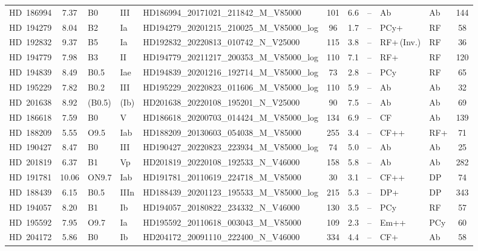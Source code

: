 {\begin{landscape}
\begin{longtable}{lclllcclllc}
\noalign{\smallskip}
HD~186994 & 7.37 & B0 & III & HD186994\_20171021\_211842\_M\_V85000 & 101 & 6.6 & -- & Ab & Ab & 144 \\
\noalign{\smallskip}
HD~194279 & 8.04 & B2 & Ia & HD194279\_20201215\_210025\_M\_V85000\_log & 96 & 1.7 & -- & PCy+ & RF & 58 \\
\noalign{\smallskip}
HD~192832 & 9.37 & B5 & Ia & HD192832\_20220813\_010742\_N\_V25000 & 115 & 3.8 & -- & RF+\,(Inv.) & RF & 36 \\
\noalign{\smallskip}
HD~194779 & 7.98 & B3 & II & HD194779\_20211217\_200353\_M\_V85000\_log & 110 & 7.1 & -- & RF+ & RF & 120 \\
\noalign{\smallskip}
HD~194839 & 8.49 & B0.5 & Iae & HD194839\_20201216\_192714\_M\_V85000\_log & 73 & 2.8 & -- & PCy & RF & 65 \\
\noalign{\smallskip}
HD~195229 & 7.82 & B0.2 & III & HD195229\_20220823\_011606\_M\_V85000\_log & 110 & 5.9 & -- & Ab & Ab & 32 \\
\noalign{\smallskip}
HD~201638 & 8.92 & (B0.5) & (Ib) & HD201638\_20220108\_195201\_N\_V25000 & 90 & 7.5 & -- & Ab & Ab & 69 \\
\noalign{\smallskip}
HD~186618 & 7.59 & B0 & V & HD186618\_20200703\_014424\_M\_V85000\_log & 134 & 6.9 & -- & CF & Ab & 139 \\
\noalign{\smallskip}
HD~188209 & 5.55 & O9.5 & Iab & HD188209\_20130603\_054038\_M\_V85000 & 255 & 3.4 & -- & CF++ & RF+ & 71 \\
\noalign{\smallskip}
HD~190427 & 8.47 & B0 & III & HD190427\_20220823\_223934\_M\_V85000\_log & 74 & 5.0 & -- & Ab & Ab & 25 \\
\noalign{\smallskip}
HD~201819 & 6.37 & B1 & Vp & HD201819\_20220108\_192533\_N\_V46000 & 158 & 5.8 & -- & Ab & Ab & 282 \\
\noalign{\smallskip}
HD~191781 & 10.06 & ON9.7 & Iab & HD191781\_20110619\_224718\_M\_V85000 & 30 & 3.1 & -- & CF++ & DP & 74 \\
\noalign{\smallskip}
HD~188439 & 6.15 & B0.5 & IIIn & HD188439\_20201123\_195533\_M\_V85000\_log & 215 & 5.3 & -- & DP+ & DP & 343 \\
\noalign{\smallskip}
HD~194057 & 8.20 & B1 & Ib & HD194057\_20180822\_234332\_N\_V46000 & 130 & 3.5 & -- & PCy & RF & 57 \\
\noalign{\smallskip}
HD~195592 & 7.95 & O9.7 & Ia & HD195592\_20110618\_003043\_M\_V85000 & 109 & 2.3 & -- & Em++ & PCy & 60 \\
\noalign{\smallskip}
HD~204172 & 5.86 & B0 & Ib & HD204172\_20091110\_222400\_N\_V46000 & 334 & 4.4 & -- & CF+ & Ab & 58 \\

\end{longtable}
\end{landscape}}

